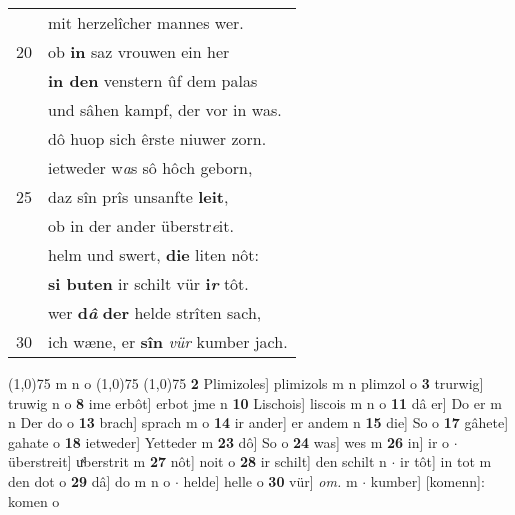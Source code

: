 \documentclass[8pt,a4paper,notitlepage]{article}
\begin{document}
\begin{table}[ht]
\begin{minipage}[t]{0.5\linewidth}
\begin{tabular}{rl}
 & mit herzelîcher mannes wer.\\ 
20 & ob \textbf{in} saz vrouwen ein her\\ 
 & \textbf{in den} venstern ûf dem palas\\ 
 & und sâhen kampf, der vor in was.\\ 
 & dô huop sich êrste niuwer zorn.\\ 
 & ietweder w\textit{a}s sô hôch geborn,\\ 
25 & daz sîn prîs unsanfte \textbf{leit},\\ 
 & ob in der ander überstr\textit{e}it.\\ 
 & helm und swert, \textbf{die} liten nôt:\\ 
 & \textbf{si buten} ir schilt vür \textbf{i\textit{r}} tôt.\\ 
 & wer \textbf{d\textit{â}} \textbf{der} helde strîten sach,\\ 
30 & ich wæne, er \textbf{sîn} \textit{vür} kumber jach.\\ 
\end{tabular}
\scriptsize
\line(1,0){75} \newline
m n o \newline
\line(1,0){75} \newline
\newline
\line(1,0){75} \newline
\textbf{2} Plimizoles] plimizols m n plimzol o \textbf{3} trurwig] truwig n o \textbf{8} ime erbôt] erbot jme n \textbf{10} Lischois] liscois m n o \textbf{11} dâ er] Do er m n Der do o \textbf{13} brach] sprach m o \textbf{14} ir ander] er andem n \textbf{15} die] So o \textbf{17} gâhete] gahate o \textbf{18} ietweder] Yetteder m \textbf{23} dô] So o \textbf{24} was] wes m \textbf{26} in] ir o  $\cdot$ überstreit] uͯberstrit m \textbf{27} nôt] noit o \textbf{28} ir schilt] den schilt n  $\cdot$ ir tôt] in tot m den dot o \textbf{29} dâ] do m n o  $\cdot$ helde] helle o \textbf{30} vür] \textit{om.} m  $\cdot$ kumber] [komenn]: komen o \newline
\end{minipage}
\end{table}
\newpage
\end{document}
